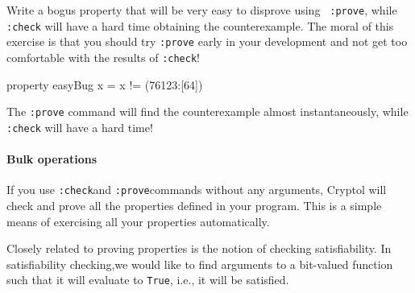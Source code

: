 \begin{Exercise}\label{ex:quick:2}
  Write a bogus property that will be very easy to disprove using {\tt
    :prove}, while {\tt :check} will have a hard time obtaining the
  counterexample.  The moral of this exercise is that you should try
  {\tt :prove} early in your development and not get too comfortable
  with the results of {\tt :check}!\indCmdProve\indCmdCheck
\end{Exercise}
\begin{Answer}
\begin{code}
  property easyBug x = x != (76123:[64])
\end{code}
The {\tt :prove} command will find the counterexample almost
instantaneously, while {\tt :check} will have a hard time!
\end{Answer}

\paragraph*{Bulk operations} If you use {\tt :check}\indCmdCheck and
{\tt :prove}\indCmdProve commands without any arguments, Cryptol will
check and prove all the properties defined in your program. This is a
simple means of exercising all your properties automatically.



Closely related to proving properties is the notion of checking
satisfiability. In satisfiability checking,\indCmdSat we would like to find
arguments to a bit-valued function such that it will evaluate to {\tt True},
i.e., it will be satisfied.\indSat


